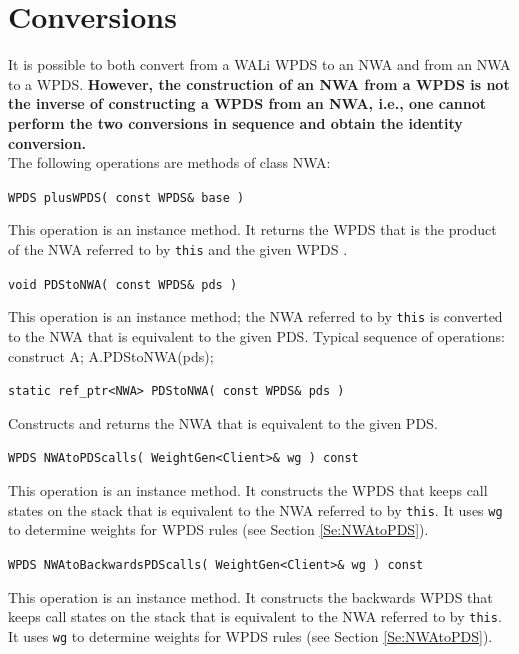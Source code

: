 \section{Conversions}
\label{Se:Conversions}


It is possible to both convert from a WALi WPDS to an NWA and from an NWA to
a WPDS.  \textbf{However, the construction of an NWA from a WPDS is not the
  inverse of constructing a WPDS from an NWA, i.e., one cannot perform the
  two conversions in sequence and obtain the identity conversion.} \\

\noindent The following operations are methods of class NWA:

\begin{description}

  \item\texttt{WPDS plusWPDS( const WPDS\& base )} \nopagebreak

    This operation is an instance method.  It returns the WPDS that is the
    product of the NWA referred to by \texttt{this} and the given WPDS
    \cite{advancedquerying}.

  \item\texttt{void PDStoNWA( const WPDS\& pds )} \nopagebreak

    This operation is an instance method; the NWA referred to by
    \texttt{this} is converted to the NWA that is equivalent to the given
    PDS.  Typical sequence of operations:
    construct A; A.PDStoNWA(pds);

  \item\texttt{static ref\_ptr<NWA> PDStoNWA( const WPDS\& pds )} \nopagebreak

    Constructs and returns the NWA that is equivalent to the given PDS.

  \item\texttt{WPDS NWAtoPDScalls( WeightGen<Client>\& wg ) const} \nopagebreak

    This operation is an instance method.  It constructs the WPDS that keeps
    call states on the stack that is equivalent to the NWA referred to by
    \texttt{this}.  It uses \texttt{wg} to determine weights for WPDS rules
    (see Section \ref{Se:NWAtoPDS}).

  \item\texttt{WPDS NWAtoBackwardsPDScalls( WeightGen<Client>\& wg ) const} \nopagebreak

    This operation is an instance method.  It constructs the backwards WPDS
    that keeps call states on the stack that is equivalent to the NWA
    referred to by \texttt{this}.  It uses \texttt{wg} to determine weights
    for WPDS rules (see Section \ref{Se:NWAtoPDS}).


\end{description}
